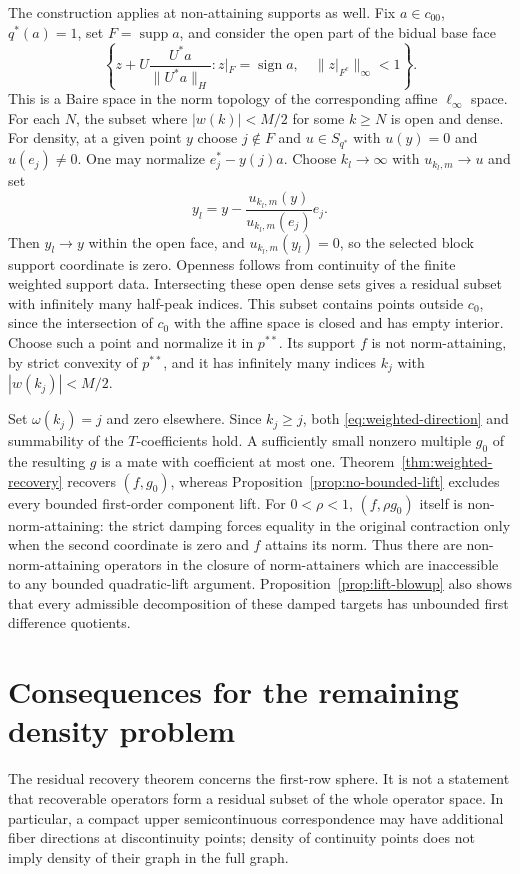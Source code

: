 \documentclass[10pt]{amsart}
\newcommand{\supp}{\operatorname{supp}}
\newcommand{\sgn}{\operatorname{sign}}
\begin{document}
\begin{remark}
The construction applies at non-attaining supports as well.
Fix $a\in c_{00}$, $q^*(a)=1$, set $F=\supp a$, and consider
the open part of the bidual base face
\[
 \left\{z+U\frac{U^*a}{\|U^*a\|_H}:
 z|_F=\sgn a,\quad\|z|_{F^c}\|_\infty<1\right\}.
\]
This is a Baire space in the norm topology of the corresponding
affine $\ell_\infty$ space. For each $N$, the subset where
$|w(k)|<M/2$ for some $k\geq N$ is open and dense.
For density, at a given point $y$ choose $j\notin F$ and
$u\in S_{q^*}$ with $u(y)=0$ and $u(e_j)\ne0$. One may normalize
$e_j^*-y(j)a$. Choose $k_l\to\infty$ with $u_{k_l,m}\to u$ and set
\[
 y_l=y-\frac{u_{k_l,m}(y)}{u_{k_l,m}(e_j)}e_j.
\]
Then $y_l\to y$ within the open face, and $u_{k_l,m}(y_l)=0$,
so the selected block support coordinate is zero.
Openness follows from continuity of the finite weighted support
data. Intersecting these open dense sets gives a residual subset
with infinitely many half-peak indices. This subset contains points
outside $c_0$, since the intersection of $c_0$ with the affine space
is closed and has empty interior. Choose such a point and
normalize it in $p^{**}$. Its support $f$ is not norm-attaining,
by strict convexity of $p^{**}$, and it has infinitely many
indices $k_j$ with $|w(k_j)|<M/2$.

Set $\omega(k_j)=j$ and zero elsewhere. Since $k_j\ge j$,
both \eqref{eq:weighted-direction} and summability of the
$T$-coefficients hold. A sufficiently small nonzero multiple
$g_0$ of the resulting $g$ is a mate with coefficient at most
one. Theorem~\ref{thm:weighted-recovery} recovers $(f,g_0)$,
whereas Proposition~\ref{prop:no-bounded-lift} excludes every
bounded first-order component lift. For $0<\rho<1$,
$(f,\rho g_0)$ itself is non-norm-attaining: the strict damping
forces equality in the original contraction only when the
second coordinate is zero and $f$ attains its norm. Thus there
are non-norm-attaining operators in the closure of norm-attainers
which are inaccessible to any bounded quadratic-lift argument.
Proposition~\ref{prop:lift-blowup} also shows that every admissible
decomposition of these damped targets has unbounded first
difference quotients.
\end{remark}

\section{Consequences for the remaining density problem}
The residual recovery theorem concerns the first-row sphere.
It is not a statement that recoverable operators form a residual
subset of the whole operator space. In particular, a compact
upper semicontinuous correspondence may have additional fiber
directions at discontinuity points; density of continuity points
does not imply density of their graph in the full graph.
\end{document}

